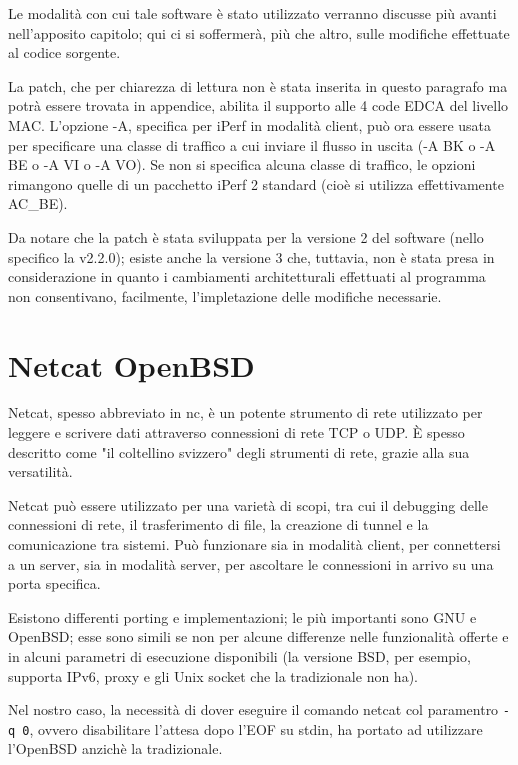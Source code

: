 Le modalità con cui tale software è stato utilizzato verranno discusse più avanti nell'apposito capitolo; qui ci si soffermerà, più che altro, sulle modifiche effettuate al codice sorgente.

La patch, che per chiarezza di lettura non è stata inserita in questo paragrafo ma potrà essere trovata in appendice, abilita il supporto alle 4 code EDCA del livello MAC. L'opzione -A, specifica per iPerf in modalità client, può ora essere usata per specificare una classe di traffico a cui inviare il flusso in uscita (-A BK o -A BE o -A VI o -A VO). Se non si specifica alcuna classe di traffico, le opzioni rimangono quelle di un pacchetto iPerf 2 standard (cioè si utilizza effettivamente AC\_BE).

Da notare che la patch è stata sviluppata per la versione 2 del software (nello specifico la v2.2.0); esiste anche la versione 3 che, tuttavia, non è stata presa in considerazione in quanto i cambiamenti architetturali effettuati al programma non consentivano, facilmente, l'impletazione delle modifiche necessarie.

\section{Netcat OpenBSD}
Netcat, spesso abbreviato in nc, è un potente strumento di rete utilizzato per leggere e scrivere dati attraverso connessioni di rete TCP o UDP. È spesso descritto come "il coltellino svizzero" degli strumenti di rete, grazie alla sua versatilità.

Netcat può essere utilizzato per una varietà di scopi, tra cui il debugging delle connessioni di rete, il trasferimento di file, la creazione di tunnel e la comunicazione tra sistemi. Può funzionare sia in modalità client, per connettersi a un server, sia in modalità server, per ascoltare le connessioni in arrivo su una porta specifica.

Esistono differenti porting e implementazioni; le più importanti sono GNU e OpenBSD; esse sono simili se non per alcune differenze nelle funzionalità offerte e in alcuni parametri di esecuzione disponibili (la versione BSD, per esempio, supporta IPv6, proxy e gli Unix socket che la tradizionale non ha). 

Nel nostro caso, la necessità di dover eseguire il comando netcat col paramentro \verb|-q 0|, ovvero disabilitare l'attesa dopo l'EOF su stdin, ha portato ad utilizzare l'OpenBSD anzichè la tradizionale.